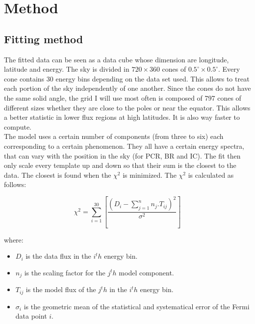 \chapter{Method}
\label{ch:method}


%

\section{Fitting method}

The fitted data can be seen as a data cube whose dimension are longitude, latitude and energy. The sky is divided in $720\times360$ cones of $ 0.5^\circ \times 0.5^\circ $. Every cone contains 30 energy bins depending on the data set used. This allows to treat each portion of the sky independently of one another. Since the cones do not have the same solid angle, the grid I will use most often is composed of 797 cones of different sizes whether they are close to the poles or near the equator. This allows a better statistic in lower flux regions at high latitudes. It is also way faster to compute. \\

The model uses a certain number of components (from three to six) each corresponding to a certain phenomenon. They all have a certain energy spectra, that can vary with the position in the sky (for PCR, BR and IC). The fit then only scale every template up and down so that their sum is the closest to the data. The closest is found when the $\chi ^2$ is minimized. The $\chi ^2$ is calculated as follows:

\begin{equation}
\chi ^2 = \sum_{i=1}^{30}[\frac{(D_i - \sum_{j=1}^{n}n_j.T_{ij})^2}{\sigma^2}]
\end{equation}

where:
\begin{itemize}
\item $D_i$ is the data flux in the $i^th$ energy bin.
\item $n_j$ is the scaling factor for the $j^th$ model component.
\item $T_{ij}$ is the model flux of the $j^th$ in the $i^th$ energy bin.
\item $\sigma_i$ is the geometric mean of the statistical and systematical error of the Fermi data point $i$.
\end{itemize}

